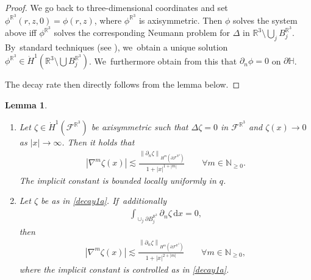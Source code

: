 \documentclass[10pt]{amsart}
\let\backslash\setminus
\newtheorem{lemma}[theorem]{Lemma}
\theoremstyle{definition}
\newcommand\R{\mathbb{R}}
\newcommand\N{\mathbb{N}}
\newcommand\norm[1]{\left\lVert #1\right\rVert}
\newcommand\eq{=}
\newcommand\dd{\,\mathrm{d}}
\newcommand\dx{\dd x}
\let\de\partial
\begin{document}
\begin{proof}
We go back to three-dimensional coordinates and set $\phi^{\R^3}(r,z,0)=\phi(r,z)$, where $\phi^{\R^3}$ is axisymmetric. Then $\phi$ solves the system above iff $\phi^{\R^3}$ solves the corresponding Neumann problem for $\Delta$ in $\R^3\backslash \bigcup_j B_j^{\R^3}$. By~standard techniques (see \eg \cite{Amrouche}), we~obtain a unique solution $\phi^{\R^3}\in \dot{H}^{1}(\R^3\backslash \bigcup B_j^{\R^3})$. We~furthermore obtain from this that $\de_n\phi=0$ on $\de\mathbb{H}$.

The decay rate then directly follows from the lemma below.
\end{proof}

\skpt
\begin{lemma}\label{decay1}
\begin{enumerate}
\item\label{decay1a}
Let $\zeta\in \dot{H}^1(\mathcal{F}^{\R^3})$ be axisymmetric such that $\Delta\zeta=0$ in $\mathcal{F}^{\R^3}$ and $\zeta(x)\to 0$ as $|x|\to\infty$. Then it holds that
\begin{align*}
\left|\nabla^m\zeta(x)\right|\lesssim \frac{\norm{\de_n\zeta}_{H^{m}(\de\mathcal{F}^{\R^3})}}{1+|x|^{1+|m|}}\qquad \forall m\in\N_{\geq 0}.
\end{align*}
The implicit constant is bounded locally uniformly in $q$.

\item\label{decay1b}
 Let $\zeta$ be as in \eqref{decay1a}. If~additionally
\begin{align*}
\int_{\cup_j \de B_j^{\R^3}}\de_n\zeta\dx\eq0,
\end{align*}
then
\begin{align*}
\left|\nabla^m\zeta(x)\right|\lesssim \frac{\norm{\de_n\zeta}_{H^{m}(\de\mathcal{F}^{\R^3})}}{1+|x|^{2+|m|}}\qquad \forall m\in\N_{\geq 0},
\end{align*}
where the implicit constant is controlled as in \eqref{decay1a}.
\end{enumerate}
\end{lemma}
\end{document}
